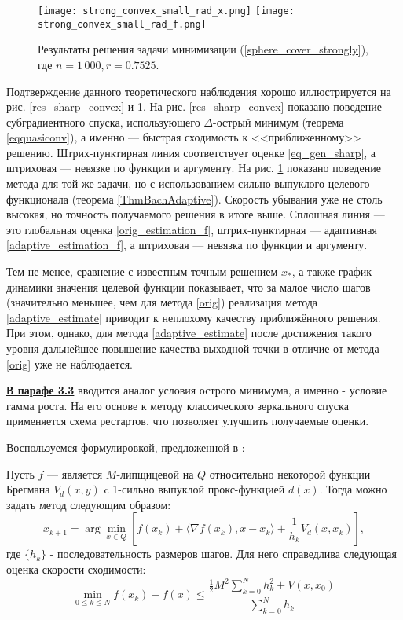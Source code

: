 \begin{figure}[h]
    \texttt{[image: strong\_convex\_small\_rad\_x.png]}
    \endminipage\hfill
    \texttt{[image: strong\_convex\_small\_rad\_f.png]}
    \endminipage\hfill
    \caption{ Результаты решения задачи минимизации (\ref{sphere_cover_strongly}), где  $n= 1\,000, r = 0.7525$.}
    \label{res_strong_convex}
\end{figure}

Подтверждение данного теоретического наблюдения хорошо иллюстрируется на рис. \ref{res_sharp_convex} и \ref{res_strong_convex}. На рис. \ref{res_sharp_convex} показано поведение субградиентного спуска, использующего $\Delta$-острый минимум (теорема \ref{eqquasiconv}), а именно --- быстрая сходимость к <<приближенному>> решению. Штрих-пунктирная линия соответствует оценке \eqref{eq_gen_sharp}, а штриховая --- невязке по функции и аргументу. На рис. \ref{res_strong_convex} показано поведение метода для той же задачи, но с использованием сильно выпуклого целевого функционала (теорема \ref{ThmBachAdaptive}). Скорость убывания уже не столь высокая, но точность получаемого решения в итоге выше. Сплошная линия --- это глобальная оценка \eqref{orig_estimation_f}, штрих-пунктирная --- адаптивная \eqref{adaptive_estimation_f}, а штриховая --- невязка по функции и аргументу.

Тем не менее, сравнение с известным точным решением $x_*$, а также график динамики значения целевой функции показывает, что за малое число шагов (значительно меньшее, чем для метода \eqref{orig}) реализация метода \eqref{adaptive_estimate} приводит к неплохому качеству приближённого решения. При этом, однако, для метода \eqref{adaptive_estimate} после достижения такого уровня дальнейшее повышение качества выходной точки в отличие от метода \eqref{orig} уже не наблюдается.

\underline{\textbf{В парафе 3.3}} вводится аналог условия острого минимума, а именно - условие гамма роста. На его основе к методу классического зеркального спуска применяется схема рестартов, что позволяет улучшить получаемые оценки.

Воспользуемся формулировкой, предложенной в :
\begin{theorem} \label{vanilla_mirror}
    Пусть $f$ --- является $M$-липщицевой на $Q$ относительно некоторой функции Брегмана $V_d(x, y)$ c 1-сильно выпуклой прокс-функцией $d(x)$. Тогда можно задать метод следующим образом:
    \begin{equation} \label{mirr_upd}
        x_{k+1} = \arg \min_{x \in Q} {\left[ f(x_k) + \langle \nabla f(x_k), x - x_k \rangle + \frac{1}{h_k} V_d(x, x_k)\right]},
    \end{equation}
    где $\{ h_k \}$ - последовательность размеров шагов.
    Для него справедлива следующая оценка скорости сходимости:
    \begin{equation} \label{general_est}
        \min_{0\leq k \leq N} f(x_k) - f(x) \leq \frac{\frac{1}{2} M^2 \sum_{k=0}^N h_k^2 + V(x, x_0)}{\sum_{k=0}^N h_k}
    \end{equation}
\end{theorem}


